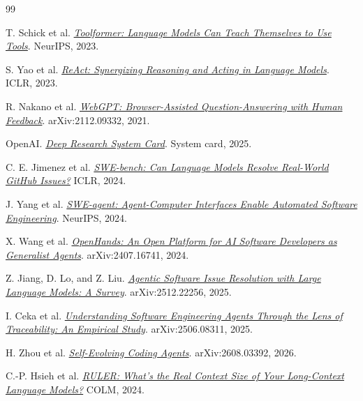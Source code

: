 \documentclass[10pt,a4paper,UTF8,fontset=none]{ctexart}
\begin{document}
\clearpage
{}
{}
\begin{thebibliography}{99}
\small
\setlength{\itemsep}{1pt}
\setlength{\parskip}{0pt}

T. Schick et al. \href{https://arxiv.org/abs/2302.04761}{\textit{Toolformer: Language Models Can Teach Themselves to Use Tools}}. NeurIPS, 2023.

S. Yao et al. \href{https://arxiv.org/abs/2210.03629}{\textit{ReAct: Synergizing Reasoning and Acting in Language Models}}. ICLR, 2023.

R. Nakano et al. \href{https://arxiv.org/abs/2112.09332}{\textit{WebGPT: Browser-Assisted Question-Answering with Human Feedback}}. arXiv:2112.09332, 2021.

OpenAI. \href{https://openai.com/index/deep-research-system-card/}{\textit{Deep Research System Card}}. System card, 2025.

C. E. Jimenez et al. \href{https://openreview.net/forum?id=VTF8yNQM66}{\textit{SWE-bench: Can Language Models Resolve Real-World GitHub Issues?}} ICLR, 2024.

J. Yang et al. \href{https://arxiv.org/abs/2405.15793}{\textit{SWE-agent: Agent-Computer Interfaces Enable Automated Software Engineering}}. NeurIPS, 2024.

X. Wang et al. \href{https://arxiv.org/abs/2407.16741}{\textit{OpenHands: An Open Platform for AI Software Developers as Generalist Agents}}. arXiv:2407.16741, 2024.

Z. Jiang, D. Lo, and Z. Liu. \href{https://arxiv.org/abs/2512.22256}{\textit{Agentic Software Issue Resolution with Large Language Models: A Survey}}. arXiv:2512.22256, 2025.

I. Ceka et al. \href{https://arxiv.org/abs/2506.08311}{\textit{Understanding Software Engineering Agents Through the Lens of Traceability: An Empirical Study}}. arXiv:2506.08311, 2025.

H. Zhou et al. \href{https://arxiv.org/abs/2608.03392}{\textit{Self-Evolving Coding Agents}}. arXiv:2608.03392, 2026.

C.-P. Hsieh et al. \href{https://arxiv.org/abs/2404.06654}{\textit{RULER: What's the Real Context Size of Your Long-Context Language Models?}} COLM, 2024.


\end{thebibliography}
\end{document}
